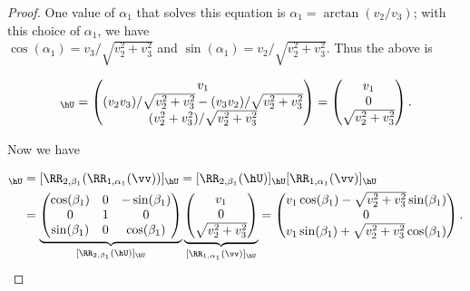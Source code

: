 \begin{proof}
    One value of $\alpha_1$ that solves this equation is $\alpha_1 = \arctan(v_2/v_3)$; with this choice of $\alpha_1$, we have \\ ${\cos(\alpha_1) = v_3/\sqrt{v_2^2 + v_3^2}}$ and ${\sin(\alpha_1) = v_2/\sqrt{v_2^2 + v_3^2}}$. Thus the above is
    
    \begin{align*}
        [\RR_{1, \alpha_1}(\vv)]_{\hU} =
        \begin{pmatrix}
            v_1 \\
            (v_2 v_3)/\sqrt{v_2^2 + v_3^2} - (v_3 v_2)/\sqrt{v_2^2 + v_3^2} \\
            (v_2^2 + v_3^2)/\sqrt{v_2^2 + v_3^2}
        \end{pmatrix}
        =
        \begin{pmatrix}
            v_1 \\
            0 \\
            \sqrt{v_2^2 + v_3^2}
        \end{pmatrix}.
    \end{align*}

    Now we have

    \begin{align*}
        [(\RR_{2, \beta_1} \circ \RR_{1, \alpha_1})(\vv)]_{\hU} &=
        [\RR_{2, \beta_1}(\RR_{1, \alpha_1}(\vv))]_{\hU} = [\RR_{2, \beta_1}(\hU)]_{\hU} [\RR_{1, \alpha_1}(\vv)]_{\hU} \\
        &=
        \underbrace
        {
            \begin{pmatrix}
                \cos(\beta_1) & 0 & -\sin(\beta_1) \\
                0 & 1 & 0 \\
                \sin(\beta_1) & 0 & \cos(\beta_1)
            \end{pmatrix}
        }_{[\RR_{2, \beta_1}(\hU)]_{\hU}}
        \underbrace
        {
            \begin{pmatrix}
                v_1 \\
                0 \\
                \sqrt{v_2^2 + v_3^2}
            \end{pmatrix}
        }_{[\RR_{1, \alpha_1}(\vv)]_{\hU}}
        =
        \begin{pmatrix}
            v_1 \cos(\beta_1) - \sqrt{v_2^2 + v_3^2} \sin(\beta_1) \\
            0 \\
            v_1 \sin(\beta_1) + \sqrt{v_2^2 + v_3^2} \cos(\beta_1)
        \end{pmatrix}.
    \end{align*}


\end{proof}
